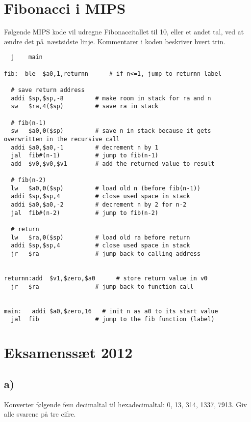 \documentclass[a4paper,11pt]{article}
\date{\Large{19. marts 2013}}
\author{\huge{\Navn}\\\Skole\\Klasse \Klasse\\\Fag\\\\Vejleder: \Vejleder}
\title{\Huge{\Titel}}
\newcommand{\tb}[1]{\textbf{#1}\\}
\begin{document}
\frenchspacing

\newpage
\section*{Fibonacci i MIPS}
Følgende MIPS kode vil udregne Fibonaccitallet til 10, eller et andet tal, ved at ændre det på næstsidste linje. Kommentarer i koden beskriver hvert trin.
\begin{verbatim}
  j    main

fib:  ble  $a0,1,returnn      # if n<=1, jump to returnn label

  # save return address
  addi $sp,$sp,-8         # make room in stack for ra and n
  sw   $ra,4($sp)         # save ra in stack

  # fib(n-1)
  sw   $a0,0($sp)         # save n in stack because it gets overwritten in the recursive call
  addi $a0,$a0,-1         # decrement n by 1
  jal  fib#(n-1)          # jump to fib(n-1)
  add  $v0,$v0,$v1        # add the returned value to result

  # fib(n-2)
  lw   $a0,0($sp)         # load old n (before fib(n-1))
  addi $sp,$sp,4          # close used space in stack
  addi $a0,$a0,-2         # decrement n by 2 for n-2
  jal  fib#(n-2)          # jump to fib(n-2)
  
  # return
  lw   $ra,0($sp)         # load old ra before return
  addi $sp,$sp,4          # close used space in stack
  jr   $ra                # jump back to calling address


returnn:add  $v1,$zero,$a0      # store return value in v0
  jr   $ra                # jump back to function call


main:   addi $a0,$zero,16   # init n as a0 to its start value
  jal  fib                # jump to the fib function (label)
\end{verbatim}

\section*{Eksamenssæt 2012}
\subsection*{a)}

Konverter følgende fem decimaltal til hexadecimaltal: 0, 13, 314, 1337, 7913. Giv alle svarene på tre cifre.
\end{document}
